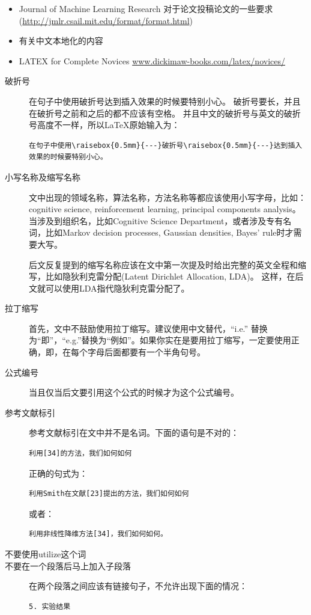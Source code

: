 \begin{itemize}
\item Journal of Machine Learning Research 对于论文投稿论文的一些要求 (\url{http://jmlr.csail.mit.edu/format/format.html})
\item 有关中文本地化的内容
\item LATEX for Complete Novices \url{www.dickimaw-books.com/latex/novices/} 
\end{itemize}

\begin{description}

\item[破折号] 在句子中使用\raisebox{0.5mm}{---}破折号\raisebox{0.5mm}{---}达到插入效果的时候要特别小心。
破折号要长，并且在破折号之前和之后的都不应该有空格。
并且中文的破折号与英文的破折号高度不一样，所以\LaTeX 原始输入为：
\begin{verbatim}
在句子中使用\raisebox{0.5mm}{---}破折号\raisebox{0.5mm}{---}达到插入效果的时候要特别小心。
\end{verbatim}
\item[小写名称及缩写名称]文中出现的领域名称，算法名称，方法名称等都应该使用小写字母，比如：cognitive science, reinforcement learning, principal components analysis。
当涉及到组织名，比如Cognitive Science Department，或者涉及专有名词，比如Markov decision processes, Gaussian densities, Bayes' rule时才需要大写。

后文反复提到的缩写名称应该在文中第一次提及时给出完整的英文全程和缩写，比如隐狄利克雷分配(Latent Dirichlet Allocation, LDA)。
这样，在后文就可以使用LDA指代隐狄利克雷分配了。
\item[拉丁缩写]首先，文中不鼓励使用拉丁缩写。建议使用中文替代，``i.e.'' 替换为“即”，``e.g.''替换为“例如”。如果你实在是要用拉丁缩写，一定要使用正确，即，在每个字母后面都要有一个半角句号。
\item[公式编号]当且仅当后文要引用这个公式的时候才为这个公式编号。
\item[参考文献标引]参考文献标引在文中并不是名词。下面的语句是不对的：
\begin{verbatim}
利用[34]的方法，我们如何如何
\end{verbatim}
正确的句式为：
\begin{verbatim}
利用Smith在文献[23]提出的方法，我们如何如何
\end{verbatim}
或者：
\begin{verbatim}
利用非线性降维方法[34]，我们如何如何。
\end{verbatim}
\item[不要使用utilize这个词]
\item[不要在一个段落后马上加入子段落]在两个段落之间应该有链接句子，不允许出现下面的情况：
\begin{verbatim}
5. 实验结果


\end{verbatim}
\end{description}

